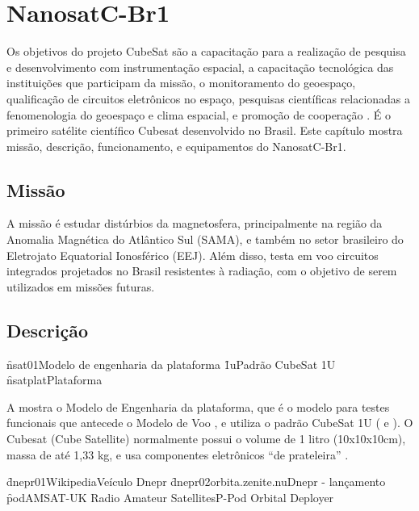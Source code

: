
\chapter{NanosatC-Br1}
\label{chp:nsat}

Os objetivos do projeto CubeSat são a capacitação para a realização de pesquisa e desenvolvimento com instrumentação espacial, a capacitação tecnológica das instituições que participam da missão, o monitoramento do geoespaço, qualificação de circuitos eletrônicos no espaço, pesquisas científicas relacionadas a fenomenologia do geoespaço e clima espacial, e promoção de cooperação \cite{Inpe}. É o primeiro satélite científico Cubesat desenvolvido no Brasil. Este capítulo mostra missão, descrição, funcionamento, e equipamentos do NanosatC-Br1.


\section{Missão} %


A missão é estudar distúrbios da magnetosfera, principalmente na região da Anomalia Magnética do Atlântico Sul (SAMA), e também no setor brasileiro do Eletrojato Equatorial Ionosférico (EEJ). Além disso, testa em voo circuitos integrados projetados no Brasil resistentes à radiação, com o objetivo de serem utilizados em missões futuras.


\section{Descrição} %

\f{nsat01}{}{Modelo de engenharia da plataforma}
\f{1u}{}{Padrão CubeSat 1U}
\f{nsatplat}{}{Plataforma}

A  mostra o Modelo de Engenharia da plataforma, que é o modelo para testes funcionais \cite{Souza2020} que antecede o Modelo de Voo \cite{esa-eng}, e utiliza o padrão CubeSat 1U ( e ). O Cubesat (Cube Satellite) normalmente possui o volume de 1 litro (10x10x10cm), massa de até 1,33 kg, e usa componentes eletrônicos ``de prateleira'' \cite{calpoly2009}.

\f{dnepr01}{Wikipedia}{Veículo Dnepr}
\f{dnepr02}{orbita.zenite.nu}{Dnepr - lançamento}
\f{pod}{AMSAT-UK Radio Amateur Satellites}{P-Pod Orbital Deployer}

